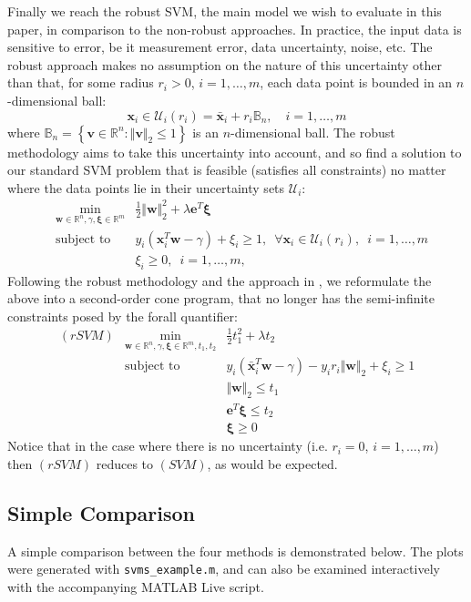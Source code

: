 \documentclass[11pt]{article}
\newcommand{\ds}{\displaystyle}
\begin{document}
Finally we reach the robust SVM, the main model we wish to evaluate in this paper, in comparison to the non-robust approaches. In practice, the input data is sensitive to error, be it measurement error, data uncertainty, noise, etc. The robust approach makes no assumption on the nature of this uncertainty other than that, for some radius $r_i>0$, $i=1,\dots,m$, each data point is bounded in an $n$-dimensional ball:
\[
\bm{x}_i\in\mathcal{U}_i(r_i) = \bar{\bm{x}}_i + r_i\mathbb{B}_n, \quad i=1,\dots,m
\]
where $\mathbb{B}_n = \left\{\bm{v}\in\mathbb{R}^n : \Vert \bm{v}\Vert_2\leq 1\right\}$ is an $n$-dimensional ball. The robust methodology aims to take this uncertainty into account, and so find a solution to our standard SVM problem that is feasible (satisfies all constraints) no matter where the data points lie in their uncertainty sets $\mathcal{U}_i$:
\begin{eqnarray*}
& \ds\min_{\bm{w}\in\mathbb{R}^n, \gamma, \bm{\xi}\in\mathbb{R}^m} & \frac{1}{2}\Vert \bm{w} \Vert_2^2 + \lambda\bm{e}^T\bm{\xi}
\\
& \mbox{subject to } & y_i(\bm{x}_i^T\bm{w} - \gamma) + \xi_i \geq 1, \enspace \forall \bm{x}_i\in\mathcal{U}_i(r_i),\enspace i=1,\dots,m
\\
& & \xi_i \geq 0, \enspace i=1,\dots,m, 
\end{eqnarray*}
Following the robust methodology and the approach in \cite{rsvm}, we reformulate the above into a second-order cone program, that no longer has the semi-infinite constraints posed by the forall quantifier:
\begin{eqnarray*}
(rSVM) & \ds\min_{\bm{w}\in\mathbb{R}^n, \gamma, \bm{\xi}\in\mathbb{R}^m, t_1, t_2} & \frac{1}{2}t_1^2 + \lambda t_2
\\
& \mbox{subject to } & y_i\left(\bar{\bm{x}}_i^T\bm{w}-\gamma\right) - y_ir_i\Vert\bm{w}\Vert_2 + \xi_i \geq 1
\\
& & \Vert \bm{w} \Vert_2 \leq t_1
\\
& & \bm{e}^T\bm{\xi} \leq t_2
\\
& & \bm{\xi}\geq 0
\end{eqnarray*}
Notice that in the case where there is no uncertainty (i.e. $r_i=0$, $i=1,\dots,m$) then $(rSVM)$ reduces to $(SVM)$, as would be expected.

\subsection*{Simple Comparison}

A simple comparison between the four methods is demonstrated below. The plots were generated with \texttt{svms\_example.m}, and can also be examined interactively with the accompanying MATLAB Live script.
\end{document}
